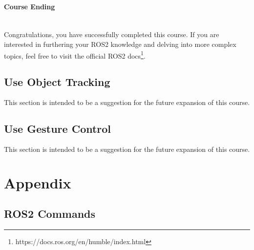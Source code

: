 \documentclass{article}
\begin{document}
\paragraph{Course Ending}~\\
Congratulations, you have successfully completed this course. If you are interested in furthering your ROS2 knowledge and delving into more complex topics, feel free to visit the official ROS2 docs\footnote{https://docs.ros.org/en/humble/index.html}.

\subsection{Use Object Tracking}
This section is intended to be a suggestion for the future expansion of this course.

\subsection{Use Gesture Control}
This section is intended to be a suggestion for the future expansion of this course.

\newpage
\section{Appendix}

\subsection{ROS2 Commands}
\end{document}

